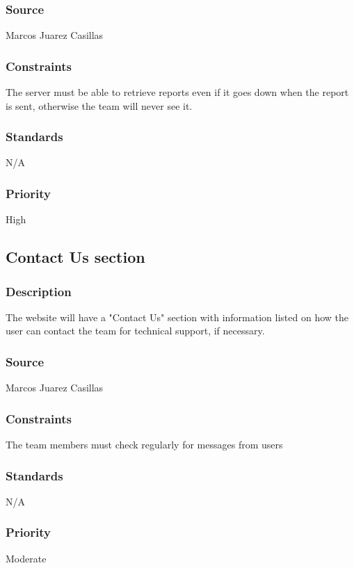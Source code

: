 \subsubsection{Source}
Marcos Juarez Casillas
\subsubsection{Constraints}
The server must be able to retrieve reports even if it goes down when the report is sent, otherwise the team will never see it.
\subsubsection{Standards}
N/A
\subsubsection{Priority}
High

\subsection{Contact Us section}
\subsubsection{Description}
The website will have a "Contact Us" section with information listed on how the user can contact the team for technical support, if necessary.
\subsubsection{Source}
Marcos Juarez Casillas
\subsubsection{Constraints}
The team members must check regularly for messages from users
\subsubsection{Standards}
N/A
\subsubsection{Priority}
Moderate

